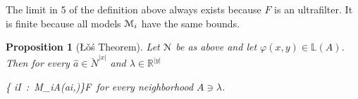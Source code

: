 \documentclass[12pt,letterpaper,oneside,reqno]{amsart}
\theoremstyle{plain}
\newtheorem{proposition}[theorem]{Proposition}
\theoremstyle{remark}
\begin{document}
The limit in 5 of the definition above always exists because $F$ is an ultrafilter.
It is finite because all models ${\EuScript M}_i$ have the same bounds.


\begin{proposition}[\L\v{o}\'s Theorem]
  Let ${\EuScript N}$ be as above and let $\varphi(x,y)\in\mathds{L}(A)$. Then for every $\hat a\in\breve N^{|x|}$ and $\lambda\in\mathds{R}^{|y|}$

  {\Leftrightarrow}
  {\big\{ i\in I\ :\ {\EuScript M}_i\models\exists \alpha\in A\;\varphi(\hat ai,\alpha)\big\}\in F}\ for every neighborhood $A\ni\lambda$.

\end{proposition}
\end{document}
